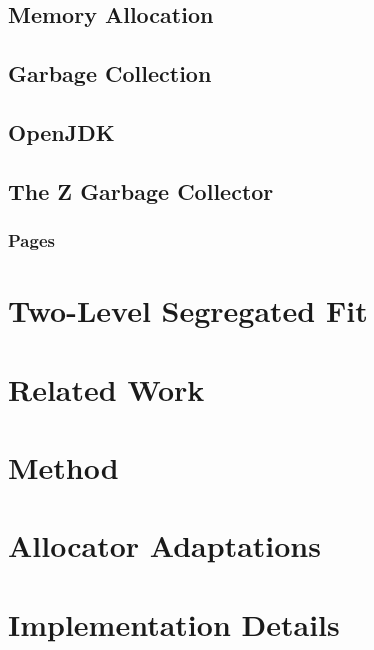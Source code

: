 \documentclass[a4paper,12pt]{article}
\begin{document}
\subsection{Memory Allocation}
\label{sec:memory_allocation}


\newpage
\subsection{Garbage Collection}
\label{sec:gc}


\subsection{OpenJDK}
\label{sec:openjdk}


\subsection{The Z Garbage Collector}
\label{sec:zgc}


\subsubsection{Pages}
\label{sec:zpage}


\section{Two-Level Segregated Fit}
\label{sec:tlsf}


\newpage

\section{Related Work}
\label{sec:related-work}


\newpage

\section{Method}
\label{sec:method}


\section{Allocator Adaptations}
\label{sec:adaptations}


\section{Implementation Details}
\label{sec:adaptations-impl}

\end{document}
